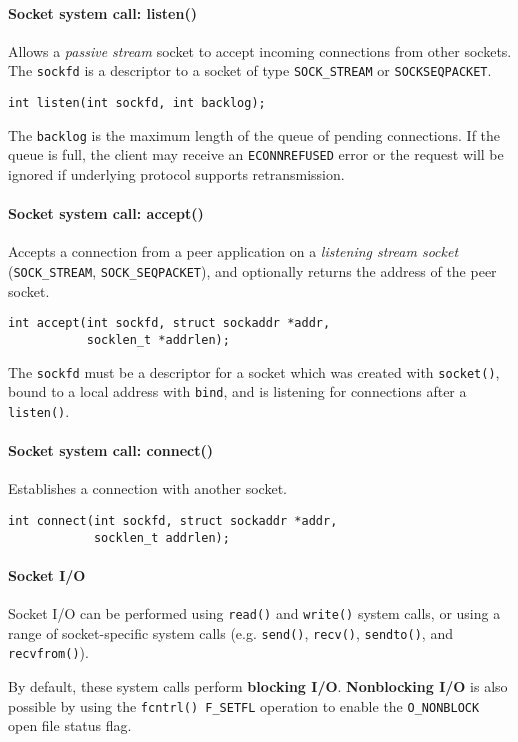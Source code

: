 \documentclass{memo}
\begin{document}
\paragraph{Socket system call: { listen()}}
Allows a {\em passive stream\/} socket to accept incoming connections from other sockets.
The \verb+sockfd+ is a descriptor to a socket of type \verb+SOCK_STREAM+ or
\verb+SOCKSEQPACKET+. 
\begin{verbatim}
int listen(int sockfd, int backlog);
\end{verbatim}
The \verb+backlog+ is the maximum length of the queue of pending
connections. If the queue is full, the client may receive an
\verb+ECONNREFUSED+ error or the request will be ignored if underlying
protocol supports retransmission.

\paragraph{Socket system call: { accept()}}
Accepts a connection from a peer application on a {\em listening stream
  socket\/} (\verb+SOCK_STREAM+, \verb+SOCK_SEQPACKET+), and 
optionally returns the address of the peer socket. 
\begin{verbatim}
int accept(int sockfd, struct sockaddr *addr,
           socklen_t *addrlen);
\end{verbatim}
The \verb+sockfd+ must be a descriptor for a socket which was created with
\verb+socket()+, bound to a local address with \verb+bind+, and is listening
for connections after a \verb+listen()+.


\paragraph{Socket system call: { connect()}}
Establishes a connection with another socket. 
\begin{verbatim}
int connect(int sockfd, struct sockaddr *addr,
            socklen_t addrlen);
\end{verbatim}

\paragraph{Socket I/O} Socket I/O can be performed using \verb+read()+ and
\verb+write()+ system calls, or using a range of socket-specific system calls
(e.g. \verb+send()+, \verb+recv()+, \verb+sendto()+, and \verb+recvfrom()+). 

By default, these system calls perform {\bf blocking I/O}. {\bf Nonblocking
  I/O} is also possible by using the \verb+fcntrl() F_SETFL+ operation to
enable the \verb+O_NONBLOCK+ open file status flag. 
\end{document}
